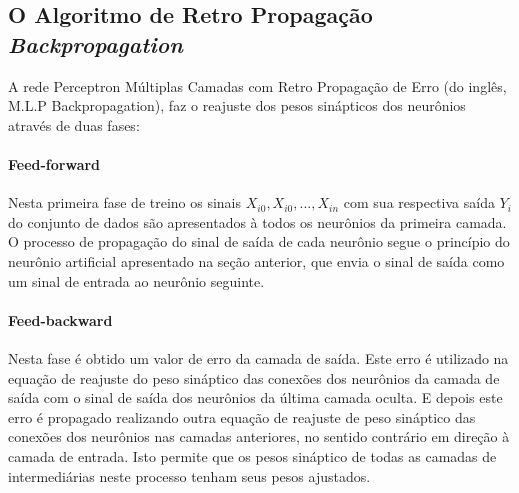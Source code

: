           	\begin{figure}[H]
          	\end{figure}

\subsection{O Algoritmo de Retro Propagação \textit{Backpropagation}}

        A rede Perceptron Múltiplas Camadas com Retro Propagação de Erro (do inglês, M.L.P Backpropagation), faz o reajuste dos pesos sinápticos dos neurônios através de duas fases:
  	       \paragraph*{Feed-forward} Nesta primeira fase de treino os sinais $X_{i0},X_{i0},...,X_{in}$ com sua respectiva saída $Y_i$ do conjunto de dados são apresentados à todos os neurônios da primeira camada. O processo de propagação do sinal de saída de cada neurônio segue o princípio do neurônio artificial apresentado na seção anterior, que envia o sinal de saída como um sinal de entrada ao neurônio seguinte.
  	       
  	       \paragraph*{Feed-backward} Nesta fase é obtido um valor de erro da camada de saída. Este erro é utilizado na equação de reajuste do peso sináptico das conexões dos neurônios da camada de saída com o sinal de saída dos neurônios da última camada oculta. E depois este erro é propagado realizando outra equação de reajuste de peso sináptico das conexões dos neurônios nas camadas anteriores, no sentido contrário em direção à camada de entrada. Isto permite que os pesos sináptico de todas as camadas de intermediárias neste processo tenham seus pesos ajustados.
  	       
